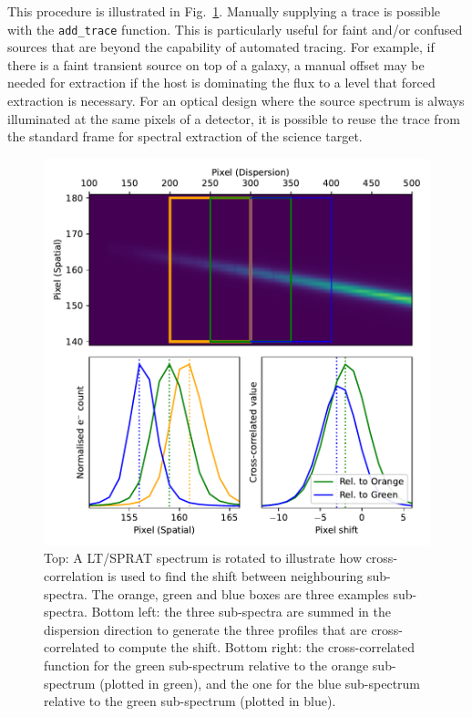 \documentclass[linenumbers, twocolumn]{aastex631}
\begin{document}
This procedure is illustrated in Fig.~\ref{fig:trace}. Manually
supplying a trace is possible with the \texttt{add\_trace}
function. This is particularly useful for faint and/or confused
sources that are beyond the capability of automated tracing. For
example, if there is a faint transient source on top of a galaxy,
a manual offset may be needed for extraction if the host is
dominating the flux to a level that forced extraction is necessary.
For an optical design where the source spectrum is always illuminated
at the same pixels of a detector, it is possible to reuse the trace
from the standard frame for spectral extraction of the science target.

\begin{figure}
    \centering
    \includegraphics[width=\columnwidth]{fig_01_tracing.pdf}
    \caption{Top: A LT/SPRAT spectrum is rotated to illustrate how
    cross-correlation is used to find the shift between neighbouring
    sub-spectra. The orange, green and blue boxes are three examples
    sub-spectra. Bottom left: the three sub-spectra are summed in
    the dispersion direction to generate the three profiles that are
    cross-correlated to compute the shift. Bottom right: the
    cross-correlated function for the green sub-spectrum relative
    to the orange sub-spectrum (plotted in green), and the one
    for the blue sub-spectrum relative to the green sub-spectrum
    (plotted in blue).}
    \label{fig:trace}
\end{figure}
\end{document}
